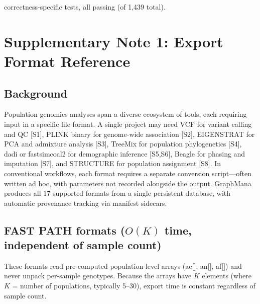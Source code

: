 \documentclass[11pt,a4paper]{article}
\begin{document}
 correctness-specific tests, all passing (of 1,439 total).

\newpage


\section{Supplementary Note 1: Export Format Reference}

\subsection*{Background}

Population genomics analyses span a diverse ecosystem of tools, each requiring input in a specific file format. A single project may need VCF for variant calling and QC [S1], PLINK binary for genome-wide association [S2], EIGENSTRAT for PCA and admixture analysis [S3], TreeMix for population phylogenetics [S4], dadi or fastsimcoal2 for demographic inference [S5,S6], Beagle for phasing and imputation [S7], and STRUCTURE for population assignment [S8]. In conventional workflows, each format requires a separate conversion script---often written ad hoc, with parameters not recorded alongside the output. GraphMana produces all 17 supported formats from a single persistent database, with automatic provenance tracking via manifest sidecars.

\subsection*{FAST PATH formats ($O(K)$ time, independent of sample count)}

These formats read pre-computed population-level arrays (ac[], an[], af[]) and never unpack per-sample genotypes. Because the arrays have $K$ elements (where $K$ = number of populations, typically 5--30), export time is constant regardless of sample count.
\end{document}
